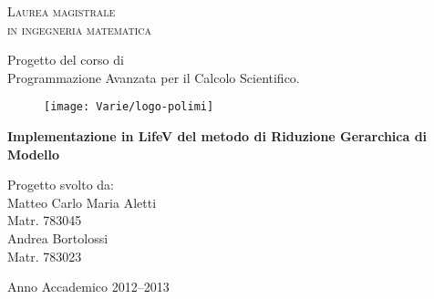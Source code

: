 \begin{titlepage}
\begin{center}
    { \scshape 
    Laurea magistrale\\
    in ingegneria matematica\\
    }
\end{center}
\vspace{1.2cm}
\begin{flushleft}
		\Large
		Progetto del corso di \\
		Programmazione Avanzata per il Calcolo Scientifico.\\
		\vspace{1.5cm}
\end{flushleft}
\begin{figure}[h]
		\centering
		\texttt{[image: Varie/logo-polimi]}
		\vspace{1cm}
\end{figure}
\begin{center}
{ \bfseries  {\Large Implementazione in LifeV del metodo di Riduzione Gerarchica di Modello}\\
\vspace{0.2cm} }
\end{center}
\vspace{0.4cm}
\begin{flushright}
		\Large
		Progetto svolto da:\\
		Matteo Carlo Maria Aletti\\
		Matr. 783045\\
		Andrea Bortolossi\\
		Matr. 783023\\
		\vspace{1.5cm}
\end{flushright}
\begin{center}
Anno Accademico 2012--2013
\end{center}

\end{titlepage}